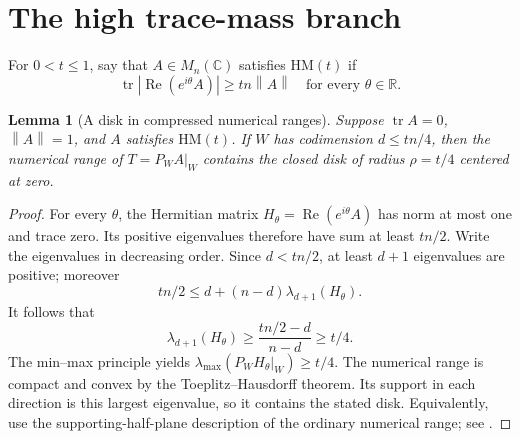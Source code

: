 \documentclass[11pt]{article}
\newtheorem{lemma}[theorem]{Lemma}
\theoremstyle{remark}
\newcommand{\C}{\mathbb C}
\newcommand{\R}{\mathbb R}
\newcommand{\tr}{\operatorname{tr}}
\newcommand{\Rea}{\operatorname{Re}}
\newcommand{\norm}[1]{\left\lVert#1\right\rVert}
\newcommand{\HM}{\mathrm{HM}}
\numberwithin{equation}{section}
\begin{document}
\section{The high trace-mass branch}\label{sec:high}
For $0<t\le1$, say that $A\in M_n(\C)$ satisfies $\HM(t)$ if
\begin{equation}\label{eq:HM}
 \tr|\Rea(e^{i\theta}A)|\ge tn\norm A\quad\text{for every }\theta\in\R.
\end{equation}

\begin{lemma}[A disk in compressed numerical ranges]\label{lem:disk}
Suppose $\tr A=0$, $\norm A=1$, and $A$ satisfies $\HM(t)$. If $W$ has
codimension $d\le tn/4$, then the numerical range of $T=P_WA|_W$ contains the
closed disk of radius $\rho=t/4$ centered at zero.
\end{lemma}
\begin{proof}
For every $\theta$, the Hermitian matrix $H_\theta=\Rea(e^{i\theta}A)$ has norm
at most one and trace zero. Its positive eigenvalues therefore have sum at
least $tn/2$. Write the eigenvalues in decreasing order. Since $d<tn/2$, at
least $d+1$ eigenvalues are positive; moreover
\[
 tn/2\le d+(n-d)\lambda_{d+1}(H_\theta).
\]
It follows that
\[
 \lambda_{d+1}(H_\theta)\ge
 \frac{tn/2-d}{n-d}\ge t/4.
\]
The min--max principle yields
$\lambda_{\max}(P_WH_\theta|_W)\ge t/4$. The numerical range is compact and
convex by the Toeplitz--Hausdorff theorem. Its support in each direction is
this largest eigenvalue, so it contains the stated disk. Equivalently, use the
supporting-half-plane description of the ordinary numerical range; see
\cite[Section 2]{LiSze}.
\end{proof}
\end{document}
